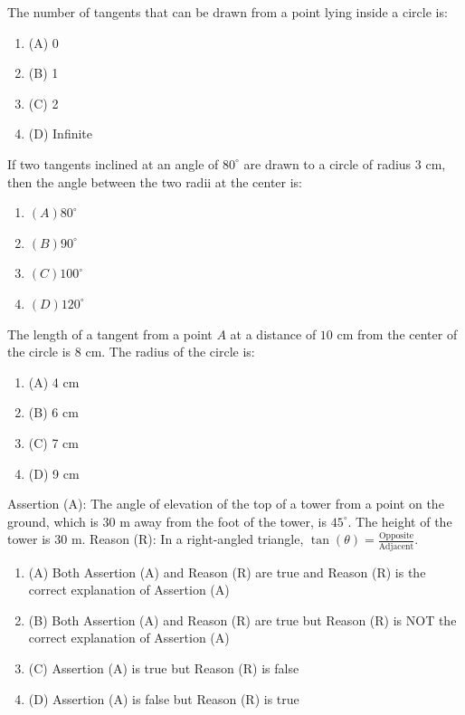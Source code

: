 \documentclass[12pt,a4paper]{exam}
\begin{document}
\begin{questions}
\question[1] The number of tangents that can be drawn from a point lying inside a circle is:
\begin{enumerate}[label=(\Alph*)]
  \item (A) 0
  \item (B) 1
  \item (C) 2
  \item (D) Infinite
\end{enumerate}
\vspace{0.15cm}

\question[1] If two tangents inclined at an angle of $80^\circ$ are drawn to a circle of radius $3 \text{ cm}$, then the angle between the two radii at the center is:
\begin{enumerate}[label=(\Alph*)]
  \item $(A) 80^\circ$
  \item $(B) 90^\circ$
  \item $(C) 100^\circ$
  \item $(D) 120^\circ$
\end{enumerate}
\vspace{0.15cm}

\question[1] The length of a tangent from a point $A$ at a distance of $10 \text{ cm}$ from the center of the circle is $8 \text{ cm}$. The radius of the circle is:
\begin{enumerate}[label=(\Alph*)]
  \item (A) 4 cm
  \item (B) 6 cm
  \item (C) 7 cm
  \item (D) 9 cm
\end{enumerate}
\vspace{0.15cm}

\question[1] Assertion (A): The angle of elevation of the top of a tower from a point on the ground, which is $30 \text{ m}$ away from the foot of the tower, is $45^\circ$. The height of the tower is $30 \text{ m}$. Reason (R): In a right-angled triangle, $\tan(\theta) = \frac{\text{Opposite}}{\text{Adjacent}}$.
\begin{enumerate}[label=(\Alph*)]
  \item (A) Both Assertion (A) and Reason (R) are true and Reason (R) is the correct explanation of Assertion (A)
  \item (B) Both Assertion (A) and Reason (R) are true but Reason (R) is NOT the correct explanation of Assertion (A)
  \item (C) Assertion (A) is true but Reason (R) is false
  \item (D) Assertion (A) is false but Reason (R) is true
\end{enumerate}
\vspace{0.15cm}


\end{questions}
\end{document}
